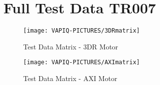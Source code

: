 \section{Full Test Data TR007}

\begin{figure}[H]
    \centering
    \texttt{[image: VAPIQ-PICTURES/3DRmatrix]}
    \caption{Test Data Matrix - 3DR Motor}
    \label{fig:3DR}
\end{figure}
\newpage
\begin{figure}[H]
    \centering
    \texttt{[image: VAPIQ-PICTURES/AXImatrix]}
    \caption{Test Data Matrix - AXI Motor}
    \label{fig:AXI}
\end{figure}